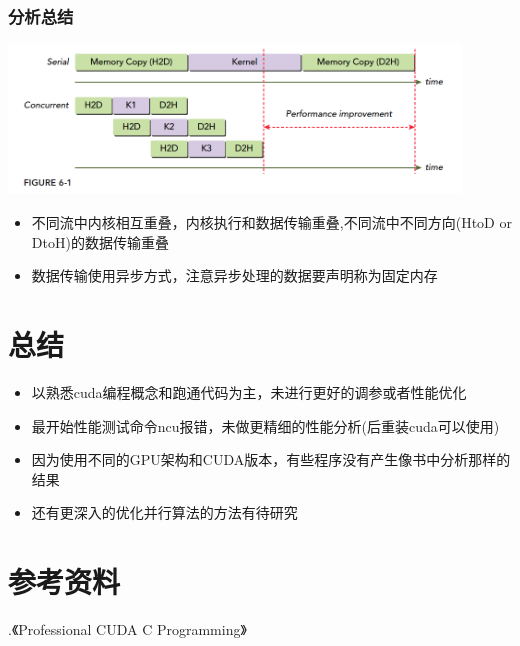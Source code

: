 \subsubsection{分析总结}
\noindent
\includegraphics[width=0.9\textwidth]{assets/overlap2.png}
\begin{itemize}
	\item 不同流中内核相互重叠，内核执行和数据传输重叠,不同流中不同方向(HtoD or DtoH)的数据传输重叠
	\item 数据传输使用异步方式，注意异步处理的数据要声明称为固定内存
\end{itemize}

\section{总结}
\begin{itemize}
	\item 以熟悉cuda编程概念和跑通代码为主，未进行更好的调参或者性能优化
	\item 最开始性能测试命令ncu报错，未做更精细的性能分析(后重装cuda可以使用)
	\item 因为使用不同的GPU架构和CUDA版本，有些程序没有产生像书中分析那样的结果
	\item 还有更深入的优化并行算法的方法有待研究
\end{itemize}
\section{参考资料}
.《Professional CUDA C Programming》 
